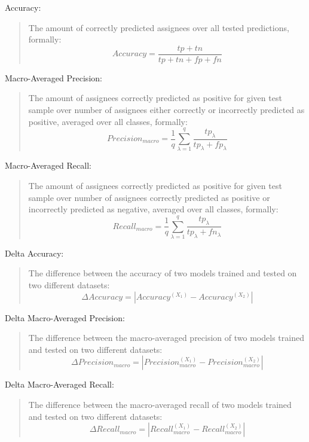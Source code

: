 \begin{framed}
  \hypertarget{metric:a}{Accuracy:}
  \begin{quote}
    The amount of correctly predicted assignees over all tested predictions, formally:
    $$Accuracy = \frac{tp+tn}{tp+tn+fp+fn}$$
  \end{quote}

  \hypertarget{metric:p}{Macro-Averaged Precision:}
  \begin{quote}
    The amount of assignees correctly predicted as positive for given test sample over number of assignees either correctly or incorrectly predicted as positive, averaged over all classes\cite{Asch2013}, formally:
    $$Precision_{macro} = \frac{1}{q}\sum_{\lambda=1}^q\frac{tp_{\lambda}}{tp_{\lambda}+fp_{\lambda}}$$
  \end{quote}

  \hypertarget{metric:r}{Macro-Averaged Recall:}
  \begin{quote}
    The amount of assignees correctly predicted as positive for given test sample over number of assignees correctly predicted as positive or incorrectly predicted as negative, averaged over all classes\cite{Asch2013}, formally:
    $$Recall_{macro} = \frac{1}{q}\sum_{\lambda=1}^q\frac{tp_{\lambda}}{tp_{\lambda}+fn_{\lambda}}$$ 
  \end{quote}

  \hypertarget{metric:da}{Delta Accuracy:}
  \begin{quote}
    The difference between the accuracy of two models trained and tested on two different datasets:
    $$\Delta Accuracy = |Accuracy^{(X_1)} - Accuracy^{(X_2)}|$$
  \end{quote}

  \hypertarget{metric:dp}{Delta Macro-Averaged Precision:}
  \begin{quote}
    The difference between the macro-averaged precision of two models trained and tested on two different datasets:
    $$\Delta Precision_{macro} = |Precision_{macro}^{(X_1)} - Precision_{macro}^{(X_2)}|$$
  \end{quote}

  \hypertarget{metric:dr}{Delta Macro-Averaged Recall:}
  \begin{quote}
    The difference between the macro-averaged recall of two models trained and tested on two different datasets:
    $$\Delta Recall_{macro} = |Recall_{macro}^{(X_1)} - Recall_{macro}^{(X_2)}|$$
  \end{quote}


\end{framed}
